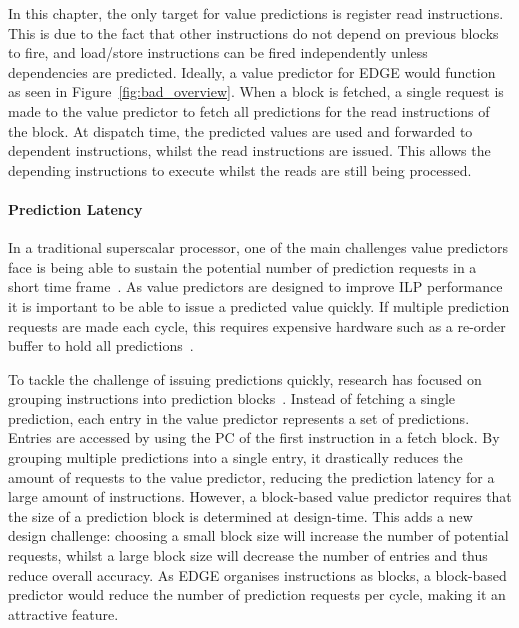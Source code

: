 In this chapter, the only target for value predictions is register read instructions.
This is due to the fact that other instructions do not depend on previous blocks to fire, and load/store instructions can be fired independently unless dependencies are predicted.
Ideally, a value predictor for EDGE would function as seen in Figure~\ref{fig:bad_overview}.
When a block is fetched, a single request is made to the value predictor to fetch all predictions for the read instructions of the block.
At dispatch time, the predicted values are used and forwarded to dependent instructions, whilst the read instructions are issued.
This allows the depending instructions to execute whilst the reads are still being processed.


\paragraph*{Prediction Latency}
In a traditional superscalar processor, one of the main challenges value predictors face is being able to sustain the potential number of prediction requests in a short time frame~\cite{peraisBeBop2015}.
As value predictors are designed to improve ILP performance it is important to be able to issue a predicted value quickly.
If multiple prediction requests are made each cycle, this requires expensive hardware such as a re-order buffer to hold all predictions~\cite{peraisBeBop2015}.

To tackle the challenge of issuing predictions quickly, research has focused on grouping instructions into prediction blocks~\cite{peraisBeBop2015}.
Instead of fetching a single prediction, each entry in the value predictor represents a set of predictions.
Entries are accessed by using the PC of the first instruction in a fetch block.
By grouping multiple predictions into a single entry, it drastically reduces the amount of requests to the value predictor, reducing the prediction latency for a large amount of instructions.
However, a block-based value predictor requires that the size of a prediction block is determined at design-time.
This adds a new design challenge: choosing a small block size will increase the number of potential requests, whilst a large block size will decrease the number of entries and thus reduce overall accuracy.
As EDGE organises instructions as blocks, a block-based predictor would reduce the number of prediction requests per cycle, making it an attractive feature.

